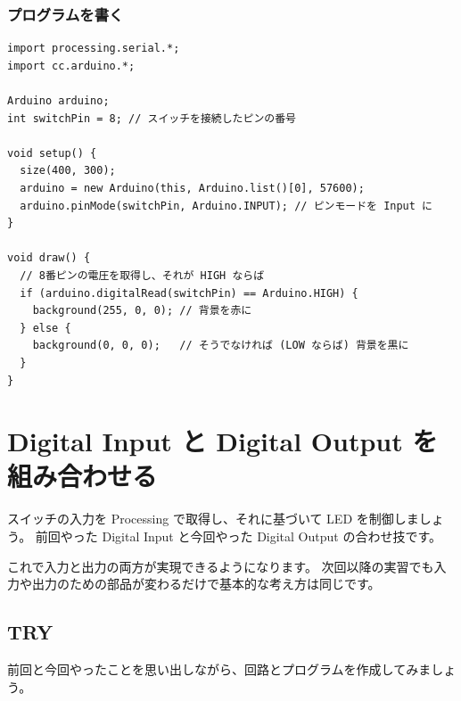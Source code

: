 \documentclass[11pt,a4paper]{jarticle}
\begin{document}

\subsubsection{プログラムを書く}
\begin{lstlisting}
import processing.serial.*;
import cc.arduino.*;

Arduino arduino;
int switchPin = 8; // スイッチを接続したピンの番号
 
void setup() {
  size(400, 300);
  arduino = new Arduino(this, Arduino.list()[0], 57600);
  arduino.pinMode(switchPin, Arduino.INPUT); // ピンモードを Input に
}
 
void draw() {
  // 8番ピンの電圧を取得し、それが HIGH ならば
  if (arduino.digitalRead(switchPin) == Arduino.HIGH) {
    background(255, 0, 0); // 背景を赤に
  } else {
    background(0, 0, 0);   // そうでなければ (LOW ならば) 背景を黒に
  }
}
\end{lstlisting}

\section{Digital Input と Digital Output を組み合わせる}
スイッチの入力を Processing で取得し、それに基づいて LED を制御しましょう。
前回やった Digital Input と今回やった Digital Output の合わせ技です。

これで入力と出力の両方が実現できるようになります。
次回以降の実習でも入力や出力のための部品が変わるだけで基本的な考え方は同じです。

\subsection*{TRY}
前回と今回やったことを思い出しながら、回路とプログラムを作成してみましょう。
\end{document}
